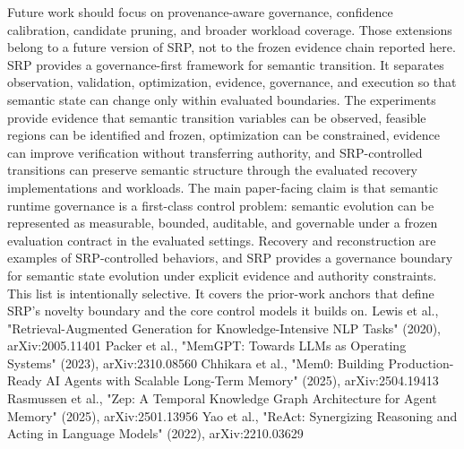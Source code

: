 {}Future work should focus on provenance-aware governance, confidence calibration, candidate pruning, and broader workload coverage. Those extensions belong to a future version of SRP, not to the frozen evidence chain reported here.\markdownRendererInterblockSeparator
{}
\markdownRendererSectionEnd \markdownRendererSectionBegin
{}\markdownRendererInterblockSeparator
{}SRP provides a governance-first framework for semantic transition. It separates observation, validation, optimization, evidence, governance, and execution so that semantic state can change only within evaluated boundaries. The experiments provide evidence that semantic transition variables can be observed, feasible regions can be identified and frozen, optimization can be constrained, evidence can improve verification without transferring authority, and SRP-controlled transitions can preserve semantic structure through the evaluated recovery implementations and workloads.\markdownRendererParagraphSeparator
{}The main paper-facing claim is that semantic runtime governance is a first-class control problem: semantic evolution can be represented as measurable, bounded, auditable, and governable under a frozen evaluation contract in the evaluated settings. Recovery and reconstruction are examples of SRP-controlled behaviors, and SRP provides a governance boundary for semantic state evolution under explicit evidence and authority constraints.\markdownRendererInterblockSeparator
{}
\markdownRendererSectionEnd \markdownRendererSectionBegin
{}\markdownRendererInterblockSeparator
{}This list is intentionally selective. It covers the prior-work anchors that define SRP's novelty boundary and the core control models it builds on.\markdownRendererInterblockSeparator
{}\markdownRendererUlBeginTight
\markdownRendererUlItem Lewis et al., "Retrieval-Augmented Generation for Knowledge-Intensive NLP Tasks" (2020), arXiv:2005.11401\markdownRendererUlItemEnd 
\markdownRendererUlItem Packer et al., "MemGPT: Towards LLMs as Operating Systems" (2023), arXiv:2310.08560\markdownRendererUlItemEnd 
\markdownRendererUlItem Chhikara et al., "Mem0: Building Production-Ready AI Agents with Scalable Long-Term Memory" (2025), arXiv:2504.19413\markdownRendererUlItemEnd 
\markdownRendererUlItem Rasmussen et al., "Zep: A Temporal Knowledge Graph Architecture for Agent Memory" (2025), arXiv:2501.13956\markdownRendererUlItemEnd 
\markdownRendererUlItem Yao et al., "ReAct: Synergizing Reasoning and Acting in Language Models" (2022), arXiv:2210.03629\markdownRendererUlItemEnd 
